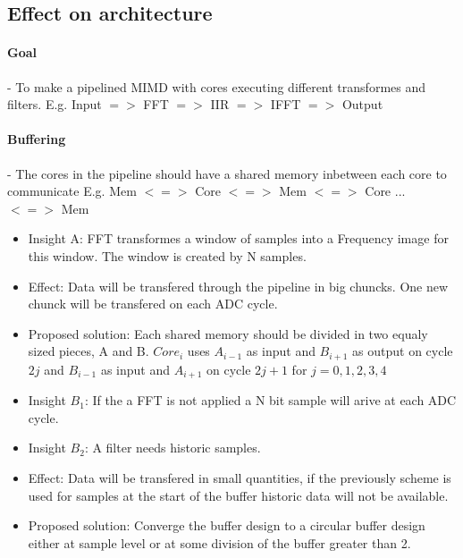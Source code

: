 \subsection{Effect on architecture}

\paragraph{Goal}
 - To make a pipelined MIMD with cores executing different transformes and
filters.
   E.g. Input $=>$ FFT $=>$ IIR $=>$ IFFT $=>$ Output

\paragraph{Buffering}
 - The cores in the pipeline should have a shared memory inbetween each core to
 communicate
   E.g. Mem $<=>$ Core $<=>$ Mem $<=>$ Core ... $<=>$ Mem

\begin{itemize}
	\item Insight A: FFT transformes a window of samples into a Frequency image
for this window. The window is created by N samples.
  \item Effect: Data will be transfered through the pipeline in big chuncks. One
new chunck will be transfered on each ADC cycle.
  \item Proposed solution: Each shared memory should be divided in two equaly
sized pieces, A and B. $Core_i$ uses $A_{i-1}$ as input and $B_{i+1}$ as
output on cycle $2j$ and $B_{i-1}$ as input and $A_{i+1}$ on cycle $2j+1$ for
$j = 0,1,2,3,4$
\end{itemize}


\begin{itemize}
	\item Insight $B_1$: If the a FFT is not applied a N  bit sample will arive
at each ADC cycle.
  \item Insight $B_2$: A filter needs historic samples.
  \item Effect: Data will be transfered in small quantities, if the previously
scheme is used for samples at the start of the buffer historic data will not be
available.
  \item Proposed solution: Converge the buffer design to a circular buffer
design either at sample level or at some division of the buffer greater than 2.
\end{itemize}


